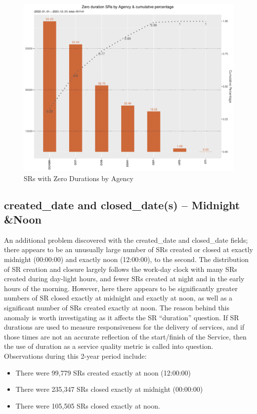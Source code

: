 \documentclass[12pt, titlepage]{article}
\begin{document}
{	\begin{figure}[H]
		 \centering
		 \includegraphics[width = \textwidth]{zero_duration_SR.pdf}
		 \caption{SRs with Zero Durations by Agency}
		 \label{fig:sero-duration}
	\end{figure}	
		
	\subsection{created\_date and closed\_date(s) -- Midnight \&Noon}
	An additional problem discovered with the created\_date and closed\_date fields; there appears to be an unusually large number of 
	SRs created or closed at exactly midnight (00:00:00) and exactly noon (12:00:00), to the second. The distribution of SR creation and closure 
	largely follows the work-day clock with many SRs created during day-light hours, and fewer SRs 
	created at night and in the early hours of the morning. 
	However, here there appears to be significantly greater numbers of SR closed exactly at midnight and exactly at noon,
	as well as a significant number of SRs created exactly at noon. The reason behind this anomaly is worth investigating 
	as it affects the SR ``duration'' question. If SR durations are used to measure responsiveness
	for the delivery of services, and if those times are not an accurate reflection of the start/finish of the Service, then the use of
	duration as a service quality metric is called into question. Observations during this 2-year period include:
	
	\begin{itemize}
		    \item There were 99,779 SRs created exactly at noon (12:00:00)
		    \item There were 235,347 SRs closed exactly at midnight (00:00:00)
		    \item There were 105,505 SRs closed exactly at noon. 
	\end{itemize}
	
}
\end{document}
